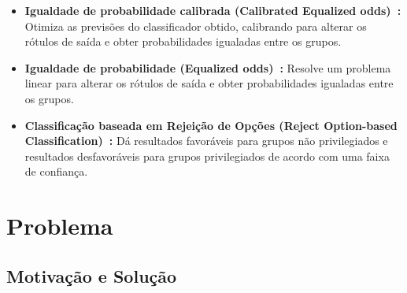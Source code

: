 \documentclass[portugues, 12pt, a4paper]{article}
\begin{document}
\begin{itemize}
\item \textbf{Igualdade de probabilidade calibrada (Calibrated Equalized odds)~\citep{Pleiss_2017}:} Otimiza as previsões do classificador obtido, calibrando para alterar os rótulos de saída e obter probabilidades igualadas entre os grupos.

\item \textbf{Igualdade de probabilidade (Equalized odds)~\citep{Hardt_2016}:} Resolve um problema linear para alterar os rótulos de saída e obter probabilidades igualadas entre os grupos.

\item \textbf{Classificação baseada em Rejeição de Opções (Reject Option-based Classification)~\citep{Kamiran_2012}:} Dá resultados favoráveis para grupos não privilegiados e resultados desfavoráveis para grupos privilegiados de acordo com uma faixa de confiança.

\end{itemize}

\section{Problema}

\subsection{Motivação e Solução}
\end{document}
